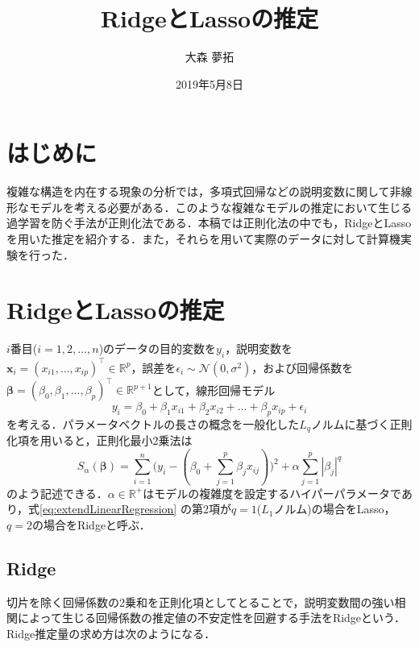 \documentclass[a4paper,twocolumn]{ujarticle} %
\title{RidgeとLassoの推定} %
\date{2019年5月8日}
\author{大森 夢拓}
\begin{document}
\maketitle
\section{はじめに}
複雑な構造を内在する現象の分析では，多項式回帰などの説明変数に関して非線形なモデルを考える必要がある．このような複雑なモデルの推定において生じる過学習を防ぐ手法が正則化法である．本稿では正則化法の中でも，RidgeとLassoを用いた推定を紹介する．また，それらを用いて実際のデータに対して計算機実験を行った．

\section{RidgeとLassoの推定}
$i$番目($i = 1, 2, \dots, n$)のデータの目的変数を$y_i$，説明変数を$\bm{x}_i=(x_{i1}, \dots, x_{ip})^{\top} \in \mathbb{R}^p$，誤差を$\epsilon_i \sim \mathcal{N}(0, \sigma^2)$，および回帰係数を$\bm{\beta}=(\beta_0, \beta_1, \dots , \beta_p)^{\top} \in \mathbb{R}^{p+1}$として，線形回帰モデル
\begin{equation}
	y_i=\beta_0 + \beta_1 x_{i1} + \beta_2  x_{i2} + \dots + \beta_p x_{ip} + \epsilon_i
	\label{eq:linear_model_origin}
\end{equation}
を考える．パラメータベクトルの長さの概念を一般化した$L_q$ノルムに基づく正則化項を用いると，正則化最小2乗法は
\begin{equation}
	S_{\alpha}(\bm{\beta}) = \sum_{i=1}^{n}\bigl(
		y_i - (
			\beta_0 + \sum_{j=1}^{p} \beta_j {x}_{ij}
		)
	\bigr)^2 + \alpha \sum_{j=1}^{p} |\beta_j|^q
	\label{eq:extendLinearRegression}
\end{equation}
のよう記述できる．$\alpha \in \mathbb{R}^+$はモデルの複雑度を設定するハイパーパラメータであり，式\eqref{eq:extendLinearRegression} の第2項が$q=1$($L_1$ノルム)の場合をLasso，$q=2$の場合をRidgeと呼ぶ．

\subsection{Ridge}
切片を除く回帰係数の2乗和を正則化項としてとることで，説明変数間の強い相関によって生じる回帰係数の推定値の不安定性を回避する手法をRidgeという．Ridge推定量の求め方は次のようになる．
\end{document}
